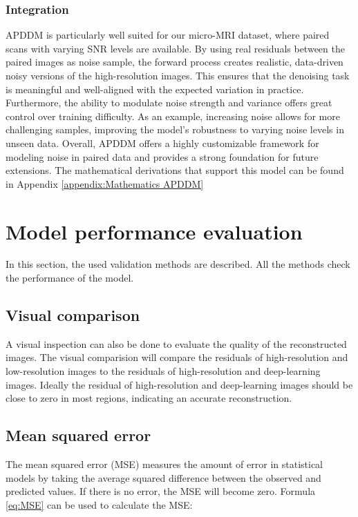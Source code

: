 \documentclass[twocolumn]{article}
\begin{document}
\subsubsection{Integration}
APDDM is particularly well suited for our micro-MRI dataset, where paired scans with varying SNR levels are available. 
By using real residuals between the paired images as noise sample, the forward process creates realistic, data-driven noisy versions of the high-resolution images. 
This ensures that the denoising task is meaningful and well-aligned with the expected variation in practice. 
Furthermore, the ability to modulate noise strength and variance offers great control over training difficulty. 
As an example, increasing noise allows for more challenging samples, improving the model's robustness to varying noise levels in unseen data. 
Overall, APDDM offers a highly customizable framework for modeling noise in paired data and provides a strong foundation for future extensions. 
The mathematical derivations that support this model can be found in Appendix \ref{appendix:Mathematics APDDM}


\section{Model performance evaluation}
In this section, the used validation methods are described. All the methods check the performance of the model. 

\subsection{Visual comparison}
A visual inspection can also be done to evaluate the quality of the reconstructed images. 
The visual comparision will compare the residuals of high-resolution and low-resolution images to the residuals of high-resolution and deep-learning images. 
Ideally the residual of high-resolution and deep-learning images should be close to zero in most regions, indicating an accurate reconstruction. 


\subsection{Mean squared error}
The mean squared error (MSE) measures the amount of error in statistical models by taking the average squared difference between the observed and predicted values. 
If there is no error, the MSE will become zero. Formula \ref{eq:MSE} can be used to calculate the MSE: 
\end{document}
